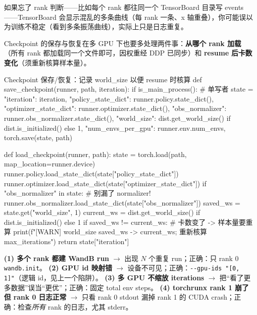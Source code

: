 如果忘了 rank 判断——比如每个 rank 都往同一个 TensorBoard 目录写 events——TensorBoard 会显示混乱的多条曲线（每 rank 一条、x 轴重叠），你可能误以为训练不稳定（看到多条振荡曲线），实际上只是日志重复。

Checkpoint 的保存与恢复在多 GPU 下也要多处理两件事：\textbf{从哪个 rank 加载}（所有 rank 都加载同一个文件即可，因权重经 DDP 已同步）和 \textbf{resume 后卡数变化}（须重新核算样本量）。

\begin{codebox}[Python]{Checkpoint 保存/恢复：记录 world\_size 以便 resume 时核算}
def save_checkpoint(runner, path, iteration):
    if is_main_process():                              # 单写者
        state = {
            "iteration": iteration,
            "policy_state_dict": runner.policy.state_dict(),
            "optimizer_state_dict": runner.optimizer.state_dict(),
            "obs_normalizer": runner.obs_normalizer.state_dict(),
            "world_size": dist.get_world_size() if dist.is_initialized() else 1,
            "num_envs_per_gpu": runner.env.num_envs,
        }
        torch.save(state, path)

def load_checkpoint(runner, path):
    state = torch.load(path, map_location=runner.device)
    runner.policy.load_state_dict(state["policy_state_dict"])
    runner.optimizer.load_state_dict(state["optimizer_state_dict"])
    if "obs_normalizer" in state:                      # 别漏了 normalizer!
        runner.obs_normalizer.load_state_dict(state["obs_normalizer"])
    saved_ws   = state.get("world_size", 1)
    current_ws = dist.get_world_size() if dist.is_initialized() else 1
    if saved_ws != current_ws:                         # 卡数变了 -> 样本量要重算
        print(f"[WARN] world_size {saved_ws} -> {current_ws}; 重新核算 max_iterations")
    return state["iteration"]
\end{codebox}

\begin{pitfall}
\textbf{(1) 多个 rank 都建 WandB run} $\to$ 出现 $N$ 个重复 run；正确：只 rank 0 \verb|wandb.init|。
\textbf{(2) GPU id 映射错} $\to$ 设备不可见；正确：\verb|--gpu-ids "[0, 1]"|（逻辑 id，见上一个陷阱）。
\textbf{(3) 多 GPU 不缩放 iterations} $\to$ 把“看了更多数据”误当“更优”；正确：固定 total env steps。
\textbf{(4) torchrunx rank 1 崩了但 rank 0 日志正常} $\to$ 只看 rank 0 stdout 漏掉 rank 1 的 CUDA crash；正确：检查\emph{所有} rank 的日志，尤其 stderr。
\end{pitfall}

